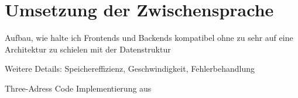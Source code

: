 \chapter{Umsetzung der Zwischensprache}
\label{chap:build:inBetweenState}

Aufbau, wie halte ich Frontends und Backends kompatibel ohne zu sehr auf eine Architektur zu schielen mit der Datenstruktur

Weitere Details: Speichereffizienz, Geschwindigkeit, Fehlerbehandlung

Three-Adress Code Implementierung aus \cite{aho:2006}

